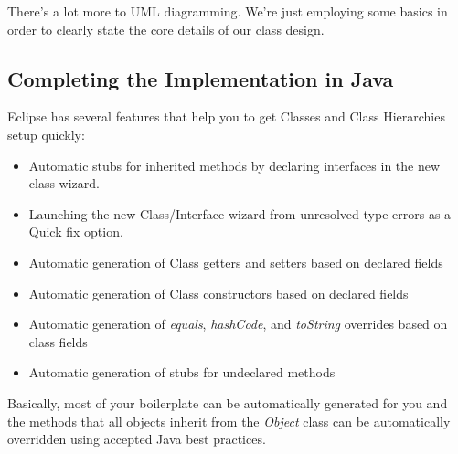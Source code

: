 \documentclass[nobib]{tufte-handout}
\begin{document}
There's a lot more to UML diagramming. We're just employing some basics in order to clearly state the core details of our class design.

\subsection{Completing the Implementation in Java}

Eclipse has several features that help you to get Classes and Class Hierarchies setup quickly:
\begin{itemize}
\item Automatic stubs for inherited methods by declaring interfaces in the new class wizard.
\item Launching the new Class/Interface wizard from unresolved type errors as a Quick fix option.
\item Automatic generation of Class getters and setters based on declared fields
\item Automatic generation of Class constructors based on declared fields
\item Automatic generation of \textit{equals}, \textit{hashCode}, and \textit{toString} overrides based on class fields
\item Automatic generation of stubs for undeclared methods
\end{itemize}
Basically, most of your boilerplate can be automatically generated for you and the methods that all objects inherit from the \textit{Object} class can be automatically overridden using accepted Java best practices.
\end{document}
